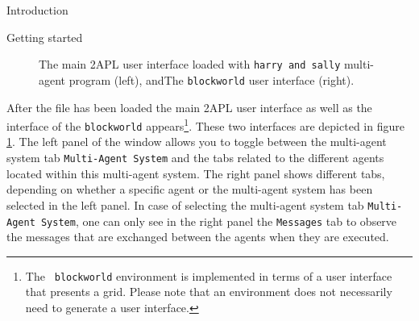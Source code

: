 \begin{chapter}{Introduction}
\begin{section}{Getting started}
\begin{figure}
    \begin{minipage}{0.6\linewidth}
        \begin{center}
        \end{center}
    \end{minipage}
    \hspace{.5cm}
    \begin{minipage}{0.3\linewidth}
        \begin{center}
        \end{center}
    \end{minipage}
    \caption{The main 2APL user interface loaded with {\tt harry and sally} multi-agent program (left), andThe {\tt blockworld} user interface (right).}\label{fig:loadedmas}
\end{figure}

After the file has been loaded the main 2APL user interface as well
as the interface of the {\tt blockworld} appears\footnote{The {\tt
blockworld} environment is implemented in terms of a user interface
that presents a grid. Please note that an environment does not
necessarily need to generate a user interface.}. These two
interfaces are depicted in figure \ref{fig:loadedmas}. The left
panel of the window allows you to toggle between the multi-agent
system tab {\tt Multi-Agent System} and the tabs related to the
different agents located within this multi-agent system. The right
panel shows different tabs, depending on whether a specific agent or
the multi-agent system has been selected in the left panel. In case
of selecting the multi-agent system tab {\tt Multi-Agent System},
one can only see in the right panel the {\tt Messages} tab to
observe the messages that are exchanged between the agents when they
are executed.


\end{section}
\end{chapter}
